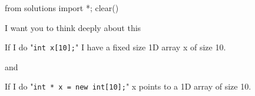 \begin{python0}
from solutions import *; clear()
\end{python0}

I want you to think deeply about this

If I do "\verb!int x[10];!" I have a fixed size 1D array x of size 10.

and

If I do "\verb!int * x = new int[10];!" x points to a 1D array of size 10.



